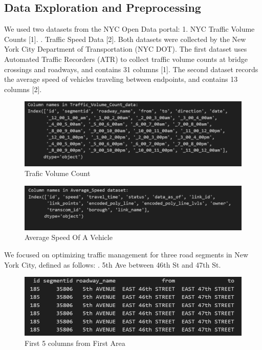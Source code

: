 \subsection{Data Exploration and Preprocessing}
We used two datasets from the NYC Open Data portal:
1. NYC Traffic Volume Counts [1].
. Traffic Speed Data [2].
\newline
\newline
Both datasets were collected by the New York City Department of Transportation (NYC DOT). The first dataset uses Automated Traffic Recorders (ATR) to collect traffic volume counts at bridge crossings and roadways, and contains 31 columns [1]. The second dataset records the average speed of vehicles traveling between endpoints, and contains 13 columns [2].
\newline
\newline
\begin{figure}[h]
    \centering
    \includegraphics[width=1\linewidth]{figures/trafic_volume_count.PNG}
    \caption{Trafic Volume Count}
    \label{fig:Trafic Volume Count}
\end{figure}
\newline
\begin{figure}[h]
    \centering
    \includegraphics[width=1\linewidth]{figures/average_speed_dataset.PNG}
    \caption{Average Speed Of A Vehicle}
    \label{fig:Average Speed Of a Vehicle}
\end{figure}
\newline
We focused on optimizing traffic management for three road segments in New York City, defined as follows:
\newline
{}. 5th Ave between 46th St and 47th St.\\
\begin{figure}[H]
    \centering
    \includegraphics[width=\textwidth]{figures/area-1.PNG}
    \caption{First 5 columns from First Area}
    \label{fig:Data From Selected Area}
\end{figure}
